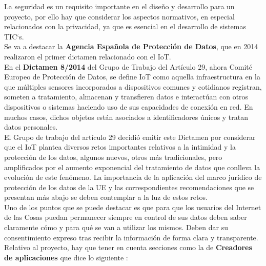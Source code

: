 {La seguridad es un requisito importante en el diseño y desarrollo para un proyecto, por ello hay que considerar los aspectos normativos, en especial relacionados con la privacidad, ya que es esencial en el desarrollo de sistemas TIC`s. \\

Se va a destacar la \textbf{Agencia Española de Protección de Datos}, que en 2014 realizaron el primer dictamen relacionado con el IoT. \\

En el \textbf{Dictamen 8/2014} del Grupo de Trabajo del Artículo 29, ahora Comité Europeo de Protección de Datos, se define IoT como aquella infraestructura en la que múltiples sensores incorporados a dispositivos comunes y cotidianos registran, someten a tratamiento, almacenan y transfieren datos e interactúan con otros dispositivos o sistemas haciendo uso de sus capacidades de conexión en red. En muchos casos, dichos objetos están asociados a identificadores únicos y tratan datos personales. \\

El Grupo de trabajo del artículo 29 decidió emitir este Dictamen por considerar que el IoT plantea
diversos retos importantes relativos a la intimidad y la protección de los datos, algunos nuevos, otros
más tradicionales, pero amplificados por el aumento exponencial del tratamiento de datos que conlleva
la evolución de este fenómeno. La importancia de la aplicación del marco jurídico de protección de los
datos de la UE y las correspondientes recomendaciones que se presentan más abajo se deben
contemplar a la luz de estos retos. \cite{aepd-info} \\

Uno de los puntos que se puede destacar es que para que los usuarios del Internet de las Cosas puedan permanecer siempre en control de sus datos deben saber claramente cómo y para qué se van a utilizar los mismos. Deben dar su consentimiento expreso tras recibir la información de forma clara y transparente. \\

Relativo al proyecto, hay que tener en cuenta secciones como la de \textbf{Creadores de aplicaciones} que dice lo siguiente \cite{dictamen8-24}:

}
